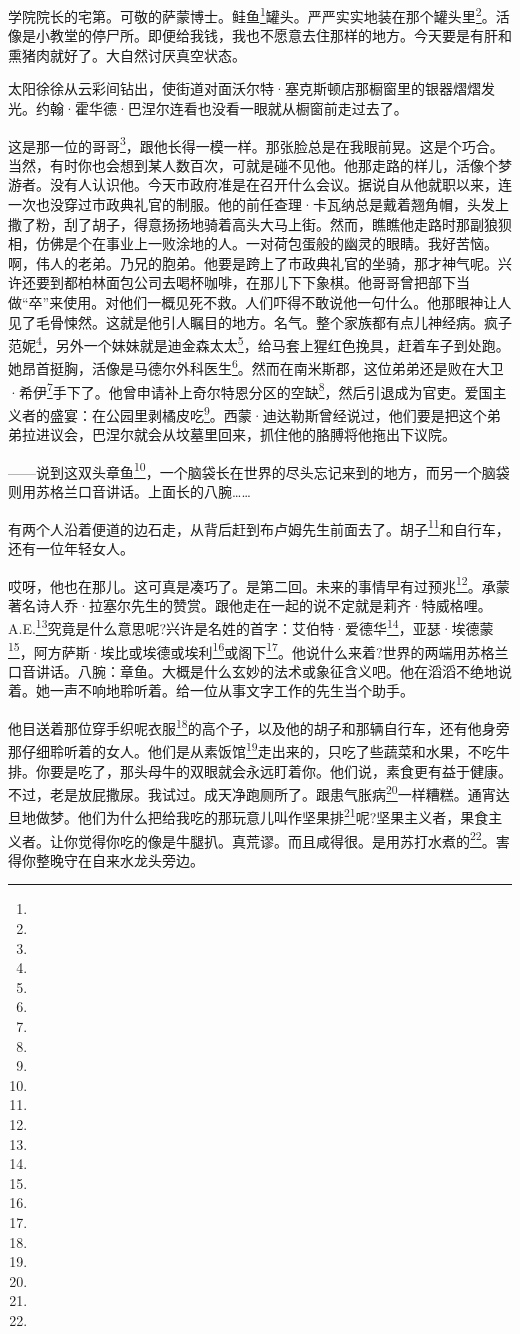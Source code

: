 \par 学院院长的宅第。可敬的萨蒙博士。鲑鱼\footnote{}罐头。严严实实地装在那个罐头里\footnote{}。活像是小教堂的停尸所。即便给我钱，我也不愿意去住那样的地方。今天要是有肝和熏猪肉就好了。大自然讨厌真空状态。
\par 太阳徐徐从云彩间钻出，使街道对面沃尔特·塞克斯顿店那橱窗里的银器熠熠发光。约翰·霍华德·巴涅尔连看也没看一眼就从橱窗前走过去了。
\par 这是那一位的哥哥\footnote{}，跟他长得一模一样。那张脸总是在我眼前晃。这是个巧合。当然，有时你也会想到某人数百次，可就是碰不见他。他那走路的样儿，活像个梦游者。没有人认识他。今天市政府准是在召开什么会议。据说自从他就职以来，连一次也没穿过市政典礼官的制服。他的前任查理·卡瓦纳总是戴着翘角帽，头发上撒了粉，刮了胡子，得意扬扬地骑着高头大马上街。然而，瞧瞧他走路时那副狼狈相，仿佛是个在事业上一败涂地的人。一对荷包蛋般的幽灵的眼睛。我好苦恼。啊，伟人的老弟。乃兄的胞弟。他要是跨上了市政典礼官的坐骑，那才神气呢。兴许还要到都柏林面包公司去喝杯咖啡，在那儿下下象棋。他哥哥曾把部下当做“卒”来使用。对他们一概见死不救。人们吓得不敢说他一句什么。他那眼神让人见了毛骨悚然。这就是他引人瞩目的地方。名气。整个家族都有点儿神经病。疯子范妮\footnote{}，另外一个妹妹就是迪金森太太\footnote{}，给马套上猩红色挽具，赶着车子到处跑。她昂首挺胸，活像是马德尔外科医生\footnote{}。然而在南米斯郡，这位弟弟还是败在大卫·希伊\footnote{}手下了。他曾申请补上奇尔特恩分区的空缺\footnote{}，然后引退成为官吏。爱国主义者的盛宴：在公园里剥橘皮吃\footnote{}。西蒙·迪达勒斯曾经说过，他们要是把这个弟弟拉进议会，巴涅尔就会从坟墓里回来，抓住他的胳膊将他拖出下议院。
\par ——说到这双头章鱼\footnote{}，一个脑袋长在世界的尽头忘记来到的地方，而另一个脑袋则用苏格兰口音讲话。上面长的八腕……
\par 有两个人沿着便道的边石走，从背后赶到布卢姆先生前面去了。胡子\footnote{}和自行车，还有一位年轻女人。
\par 哎呀，他也在那儿。这可真是凑巧了。是第二回。未来的事情早有过预兆\footnote{}。承蒙著名诗人乔·拉塞尔先生的赞赏。跟他走在一起的说不定就是莉齐·特威格哩。A.E.\footnote{}究竟是什么意思呢?兴许是名姓的首字：艾伯特·爱德华\footnote{}，亚瑟·埃德蒙\footnote{}，阿方萨斯·埃比或埃德或埃利\footnote{}或阁下\footnote{}。他说什么来着?世界的两端用苏格兰口音讲话。八腕：章鱼。大概是什么玄妙的法术或象征含义吧。他在滔滔不绝地说着。她一声不响地聆听着。给一位从事文字工作的先生当个助手。
\par 他目送着那位穿手织呢衣服\footnote{}的高个子，以及他的胡子和那辆自行车，还有他身旁那仔细聆听着的女人。他们是从素饭馆\footnote{}走出来的，只吃了些蔬菜和水果，不吃牛排。你要是吃了，那头母牛的双眼就会永远盯着你。他们说，素食更有益于健康。不过，老是放屁撒尿。我试过。成天净跑厕所了。跟患气胀病\footnote{}一样糟糕。通宵达旦地做梦。他们为什么把给我吃的那玩意儿叫作坚果排\footnote{}呢?坚果主义者，果食主义者。让你觉得你吃的像是牛腿扒。真荒谬。而且咸得很。是用苏打水煮的\footnote{}。害得你整晚守在自来水龙头旁边。
